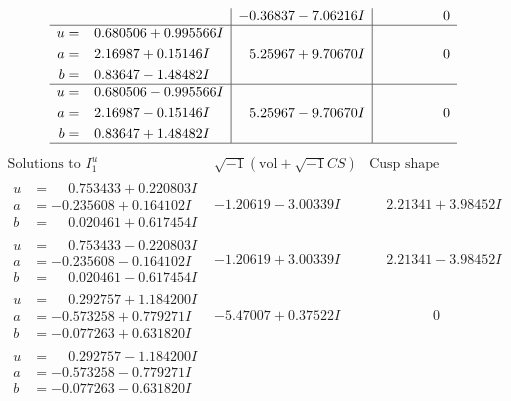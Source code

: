 \documentclass[1p]{elsarticle_modified}
\theoremstyle{definition}
\newcommand{\I}{\sqrt{-1}}
\begin{document}
$$\begin{array}{c|c|c}
 & -0.36837 - 7.06216 I & \phantom{-0.000000 } 0 \\ \hline\begin{aligned}
u &= \phantom{-}0.680506 + 0.995566 I \\
a &= \phantom{-}2.16987 + 0.15146 I \\
b &= \phantom{-}0.83647 - 1.48482 I\end{aligned}
 & \phantom{-}5.25967 + 9.70670 I & \phantom{-0.000000 } 0 \\ \hline\begin{aligned}
u &= \phantom{-}0.680506 - 0.995566 I \\
a &= \phantom{-}2.16987 - 0.15146 I \\
b &= \phantom{-}0.83647 + 1.48482 I\end{aligned}
 & \phantom{-}5.25967 - 9.70670 I & \phantom{-0.000000 } 0\\
 \hline 
 \end{array}$$\newpage$$\begin{array}{c|c|c}  
\text{Solutions to }I^u_{1}& \I (\text{vol} + \sqrt{-1}CS) & \text{Cusp shape}\\
 \hline 
\begin{aligned}
u &= \phantom{-}0.753433 + 0.220803 I \\
a &= -0.235608 + 0.164102 I \\
b &= \phantom{-}0.020461 + 0.617454 I\end{aligned}
 & -1.20619 - 3.00339 I & \phantom{-}2.21341 + 3.98452 I \\ \hline\begin{aligned}
u &= \phantom{-}0.753433 - 0.220803 I \\
a &= -0.235608 - 0.164102 I \\
b &= \phantom{-}0.020461 - 0.617454 I\end{aligned}
 & -1.20619 + 3.00339 I & \phantom{-}2.21341 - 3.98452 I \\ \hline\begin{aligned}
u &= \phantom{-}0.292757 + 1.184200 I \\
a &= -0.573258 + 0.779271 I \\
b &= -0.077263 + 0.631820 I\end{aligned}
 & -5.47007 + 0.37522 I & \phantom{-0.000000 } 0 \\ \hline\begin{aligned}
u &= \phantom{-}0.292757 - 1.184200 I \\
a &= -0.573258 - 0.779271 I \\
b &= -0.077263 - 0.631820 I\end{aligned}

\end{array}$$
\end{document}
